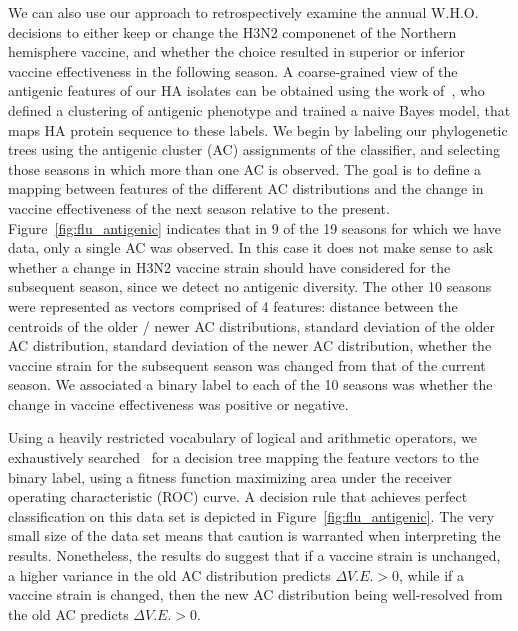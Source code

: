 \documentclass[a4paper,11pt]{article}
\begin{document}
We can also use our approach to retrospectively examine the annual W.H.O. decisions to either keep or change the H3N2 componenet of the Northern hemisphere vaccine, and whether the choice resulted in superior or inferior vaccine effectiveness in the following season.
A coarse-grained view of the antigenic features of our HA isolates can be obtained using the work of~\cite{du2012mapping}, who defined a clustering of antigenic phenotype and trained a naive Bayes model, that maps HA protein sequence to these labels.
We begin by labeling our phylogenetic trees using the antigenic cluster (AC) assignments of the classifier, and selecting those seasons in which more than one AC is observed.
The goal is to define a mapping between features of the different AC distributions and the change in vaccine effectiveness of the next season relative to the present.
Figure~\ref{fig:flu_antigenic} indicates that in 9 of the 19 seasons for which we have data, only a single AC was observed.
In this case it does not make sense to ask whether a change in H3N2 vaccine strain should have considered for the subsequent season, since we detect no antigenic diversity.
The other 10 seasons were represented as vectors comprised of 4 features: distance between the centroids of the older / newer AC distributions, standard deviation of the older AC distribution, standard deviation of the newer AC distribution, whether the vaccine strain for the subsequent season was changed from that of the current season.  We associated a binary label to each of the 10 seasons was whether the change in vaccine effectiveness was positive or negative.

Using a heavily restricted vocabulary of logical and arithmetic operators, we exhaustively searched~\cite{schmidt2009distilling} for a decision tree mapping the feature vectors to the binary label, using a fitness function maximizing area under the receiver operating characteristic (ROC) curve.
A decision rule that achieves perfect classification on this data set is depicted in Figure~\ref{fig:flu_antigenic}.
The very small size of the data set means that caution is warranted when interpreting the results.
Nonetheless, the results do suggest that if a vaccine strain is unchanged, a higher variance in the old AC distribution predicts $\Delta V.E. > 0$, while if a vaccine strain is changed, then the new AC distribution being well-resolved from the old AC predicts $\Delta V.E. > 0$.
\end{document}
